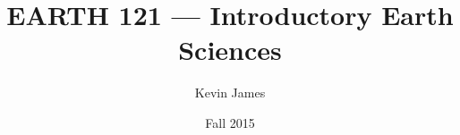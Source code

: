 \documentclass[12pt]{article}
\begin{document}
\title{EARTH 121 --- Introductory Earth Sciences}
\author{Kevin James}
\date{\vspace{-2ex}Fall 2015}
\maketitle\HRule

\tableofcontents
\newpage
\end{document}

